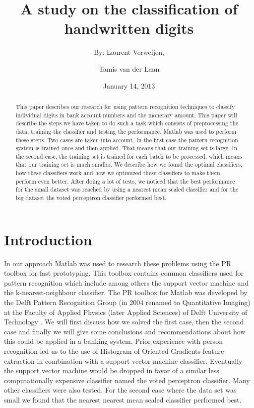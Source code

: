 \documentclass[%
        compressed,
        final,
        notitlepage,
        narroweqnarray,
        inline,
        twoside,
        ]{ieee}
\title{A study on the classification of handwritten digits}
\author{By: Laurent Verweijen, \and Tamis van der Laan}
\date{January 14, 2013}
\begin{document}
\maketitle

\begin{abstract}
This paper describes our research for using pattern recognition techniques to
classify individual digits in bank account numbers and the monetary amount. This
paper will describe the steps we have taken to do such a task which consists of
preprocessing the data, training the classifier and testing the performance.
Matlab was used to perform these steps. Two cases are taken into account. In the
first case the pattern recognition system is trained once and then applied.
That means that our training set is large. In the second case, the training set
is trained for each batch to be processed, which means that our training set is
much smaller. We describe how we found the optimal classifiers, how these
classifiers work and how we optimized these classifiers to make them perform
even better. After doing a lot of tests, we noticed that the best performance
for the small dataset was reached by using a nearest mean scaled classifier and
for the big dataset the voted perceptron classifier performed best. 
\end{abstract}

\section{Introduction}
In our approach Matlab was used to research these problems using the PR toolbox
for fast prototyping. 
This toolbox contains common classifiers used for pattern recognition which
include among others the support vector machine and the k-nearest-neighbour
classifier. 
The PR toolbox for Matlab was developed by the Delft Pattern Recognition Group
(in 2004 renamed to Quantitative Imaging) at the Faculty of Applied Physics
(later Applied Sciences) of Delft University of Technology \cite{Ferdi}.
We will first
discuss how we solved the first case, then the second case and finally we will
give some conclusions and recommendations about how this could be applied in a
banking system. Prior experience with person recognition \cite{Tamis} led us to
the use of Histogram of Oriented Gradients feature
extraction in combination with a support vector machine classifier. Eventually
the support vector machine would be dropped in favor of a similar less
computationally expensive classifier named the voted perceptron classifier. Many
other classifiers were also tested. For the second case where the data set was
small we found that the nearest nearest mean scaled classifier performed best.
\end{document}
